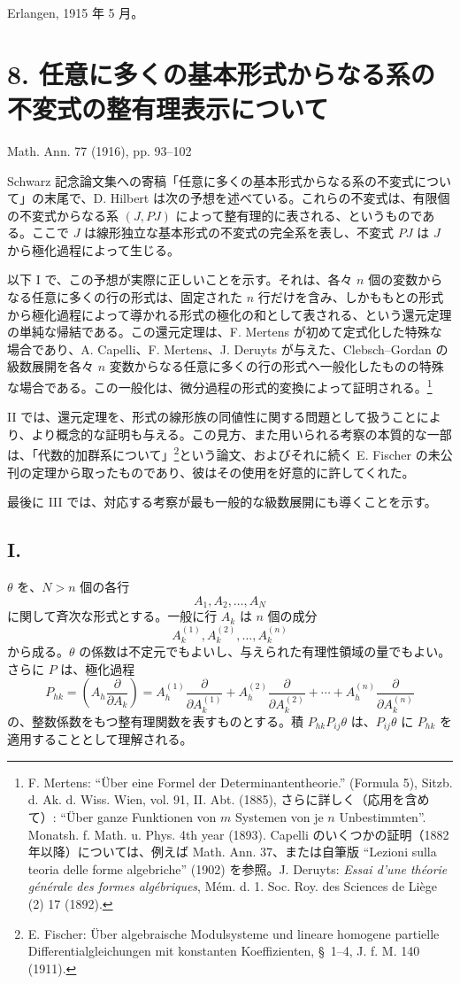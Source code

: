 \documentclass[11pt]{article}
\begin{document}
Erlangen, 1915 年 5 月。

\clearpage
\section*{8. 任意に多くの基本形式からなる系の不変式の整有理表示について}
\begin{center}
Math. Ann. 77 (1916), pp. 93--102
\end{center}

Schwarz 記念論文集への寄稿「任意に多くの基本形式からなる系の不変式について」の末尾で、D. Hilbert は次の予想を述べている。これらの不変式は、有限個の不変式からなる系 $(J,PJ)$ によって整有理的に表される、というものである。ここで $J$ は線形独立な基本形式の不変式の完全系を表し、不変式 $PJ$ は $J$ から極化過程によって生じる。

以下 I で、この予想が実際に正しいことを示す。それは、各々 $n$ 個の変数からなる任意に多くの行の形式は、固定された $n$ 行だけを含み、しかももとの形式から極化過程によって導かれる形式の極化の和として表される、という還元定理の単純な帰結である。この還元定理は、F. Mertens が初めて定式化した特殊な場合であり、A. Capelli、F. Mertens、J. Deruyts が与えた、Clebsch--Gordan の級数展開を各々 $n$ 変数からなる任意に多くの行の形式へ一般化したものの特殊な場合である。この一般化は、微分過程の形式的変換によって証明される。\footnote{F. Mertens: ``Über eine Formel der Determinantentheorie.'' (Formula 5), Sitzb. d. Ak. d. Wiss. Wien, vol. 91, II. Abt. (1885), さらに詳しく（応用を含めて）: ``Über ganze Funktionen von $m$ Systemen von je $n$ Unbestimmten''. Monatsh. f. Math. u. Phys. 4th year (1893). Capelli のいくつかの証明（1882 年以降）については、例えば Math. Ann. 37、または自筆版 ``Lezioni sulla teoria delle forme algebriche'' (1902) を参照。J. Deruyts: \emph{Essai d'une théorie générale des formes algébriques}, Mém. d. 1. Soc. Roy. des Sciences de Liège (2) 17 (1892).}

II では、還元定理を、形式の線形族の同値性に関する問題として扱うことにより、より概念的な証明も与える。この見方、また用いられる考察の本質的な一部は、「代数的加群系について」\footnote{E. Fischer: Über algebraische Modulsysteme und lineare homogene partielle Differentialgleichungen mit konstanten Koeffizienten, \S\ 1--4, J. f. M. 140 (1911).}という論文、およびそれに続く E. Fischer の未公刊の定理から取ったものであり、彼はその使用を好意的に許してくれた。

最後に III では、対応する考察が最も一般的な級数展開にも導くことを示す。

\subsection*{I.}
$\theta$ を、$N>n$ 個の各行
\[
  A_1,A_2,\ldots,A_N
\]
に関して斉次な形式とする。一般に行 $A_k$ は $n$ 個の成分
\[
  A_k^{(1)},A_k^{(2)},\ldots,A_k^{(n)}
\]
から成る。$\theta$ の係数は不定元でもよいし、与えられた有理性領域の量でもよい。さらに $P$ は、極化過程
\[
  P_{hk}=\left(A_h\frac{\partial}{\partial A_k}\right)
  =A_h^{(1)}\frac{\partial}{\partial A_k^{(1)}}+
   A_h^{(2)}\frac{\partial}{\partial A_k^{(2)}}+
   \cdots+
   A_h^{(n)}\frac{\partial}{\partial A_k^{(n)}}
\]
の、整数係数をもつ整有理関数を表すものとする。積 $P_{hk}P_{ij}\theta$ は、$P_{ij}\theta$ に $P_{hk}$ を適用することとして理解される。
\end{document}
